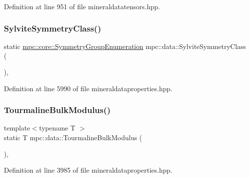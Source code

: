 Definition at line 951 of file mineraldatatensors.\+hpp.

\mbox{\label{namespacempc_1_1data_a707031ee6f60f85990bd1a8bbc0eb70b}} 
\subsubsection{\texorpdfstring{Sylvite\+Symmetry\+Class()}{SylviteSymmetryClass()}}
{\footnotesize\ttfamily static \mbox{\hyperlink{namespacempc_1_1core_a9d979684062547055a0ef5c13077bad8}{mpc\+::core\+::\+Symmetry\+Group\+Enumeration}} mpc\+::data\+::\+Sylvite\+Symmetry\+Class (\begin{DoxyParamCaption}{ }\end{DoxyParamCaption})\hspace{0.3cm}{\ttfamily [inline]}, {\ttfamily [static]}}



Definition at line 5990 of file mineraldataproperties.\+hpp.

\mbox{\label{namespacempc_1_1data_aeb5dc386f73e210b4aa2b3003b14a546}} 
\subsubsection{\texorpdfstring{Tourmaline\+Bulk\+Modulus()}{TourmalineBulkModulus()}}
{\footnotesize\ttfamily template$<$typename T $>$ \\
static T mpc\+::data\+::\+Tourmaline\+Bulk\+Modulus (\begin{DoxyParamCaption}{ }\end{DoxyParamCaption})\hspace{0.3cm}{\ttfamily [inline]}, {\ttfamily [static]}}



Definition at line 3985 of file mineraldataproperties.\+hpp.

\mbox{\label{namespacempc_1_1data_a7912ed22f7cc1f5526cf2844a78051d6}} 
